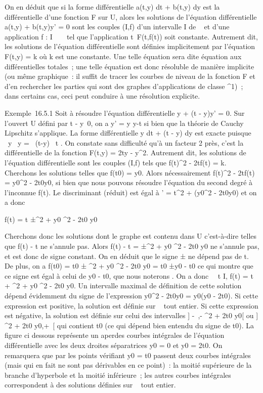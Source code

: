 On en déduit que si la forme différentielle a(t,y) dt + b(t,y) dy est la
différentielle d'une fonction F sur U, alors les solutions de l'équation
différentielle a(t,y) + b(t,y)y' = 0 sont les couples (I,f) d'un
intervalle I de ~ et d'une application f : I \rightarrow~ ~ tel que l'application
t\mapsto~F(t,f(t)) soit constante. Autrement dit,
les solutions de l'équation différentielle sont définies implicitement
par l'équation F(t,y) = k où k est une constante. Une telle équation
sera dite équation aux différentielles totales~; une telle équation est
donc résoluble de manière implicite (ou même graphique~: il suffit de
tracer les courbes de niveau de la fonction F et d'en rechercher les
parties qui sont des graphes d'applications de classe ^1)~;
dans certains cas, ceci peut conduire à une résolution explicite.

Exemple~16.5.1 Soit à résoudre l'équation différentielle y + (t - y)y' =
0. Sur l'ouvert U défini par t - y\neq~0, on a y'
= y \over y-t si bien que la théorie de Cauchy
Lipschitz s'applique. La forme différentielle y dt + (t - y) dy est
exacte puisque  \partial~y \over \partial~y = \partial~(t-y)
\over \partial~t . On constate sans difficulté qu'à un facteur
2 près, c'est la différentielle de la fonction F(t,y) = 2ty -
y^2. Autrement dit, les solutions de l'équation
différentielle sont les couples (I,f) tels que f(t)^2 -
2tf(t) = k. Cherchons les solutions telles que f(t0) =
y0. Alors nécessairement f(t)^2 - 2tf(t) =
y0^2 - 2t0y0, si bien que nous
pouvons résoudre l'équation du second degré à l'inconnue f(t). Le
discriminant (réduit) est égal à \Delta' = t^2 +
(y0^2 - 2t0y0) et on a donc

f(t) = t ±\sqrtt^2  + y0 ^2
 - 2t0  y0

Cherchons donc les solutions dont le graphe est contenu dans U
c'est-à-dire telles que f(t) - t ne s'annule pas. Alors f(t) - t =
±\sqrtt^2  + y0 ^2  -
2t0  y0 ne s'annule pas, et est donc de signe
constant. On en déduit que le signe ± ne dépend pas de t. De plus, on a
f(t0) = t0 ±
^2  + y0 ^2  - 2t0  y0 =
t0 ±\textbar{}y0 - t0\textbar{} ce qui
montre que ce signe est égal à celui de y0 - t0, que
nous noterons . On a donc \forall~~t \in I,
f(t) = t + \sqrtt^2  +
y0 ^2  - 2t0  y0. Un intervalle
maximal de définition de cette solution dépend évidemment du signe de
l'expression y0^2 - 2t0y0 =
y0(y0 - 2t0). Si cette expression est
positive, la solution est définie sur ~ tout entier. Si cette expression
est négative, la solution est définie sur celui des intervalles {]}
-\infty~,- ^2  + 2t0 
y0{[} ou {]} ^2  +
2t0  y0,+\infty~{[} qui contient t0 (ce qui
dépend bien entendu du signe de t0). La figure ci dessous
représente un aper\ccu des courbes intégrales de
l'équation différentielle avec les deux droites séparatrices
y0 = 0 et y0 = 2t0. On remarquera que par
les points vérifiant y0 = t0 passent deux courbes
intégrales (mais qui en fait ne sont pas dérivables en ce point)~: la
moitié supérieure de la branche d'hyperbole et la moitié inférieure~;
les autres courbes intégrales correspondent à des solutions définies sur
~ tout entier.

